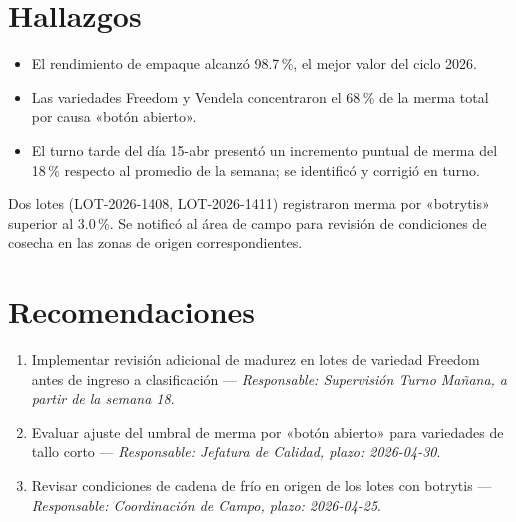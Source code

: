 \documentclass{../base/canon}
\begin{document}
\section{Hallazgos}

\begin{itemize}
  \item El rendimiento de empaque alcanzó 98.7\,\%, el mejor valor del ciclo 2026.
  \item Las variedades Freedom y Vendela concentraron el 68\,\% de la merma total
        por causa «botón abierto».
  \item El turno tarde del día 15-abr presentó un incremento puntual de merma del
        18\,\% respecto al promedio de la semana; se identificó y corrigió en turno.
\end{itemize}

\begin{ObservationBox}
  Dos lotes (LOT-2026-1408, LOT-2026-1411) registraron merma por «botrytis» superior
  al 3.0\,\%. Se notificó al área de campo para revisión de condiciones de cosecha
  en las zonas de origen correspondientes.
\end{ObservationBox}

\section{Recomendaciones}

\begin{enumerate}
  \item Implementar revisión adicional de madurez en lotes de variedad Freedom antes
        de ingreso a clasificación — \textit{Responsable: Supervisión Turno Mañana,
        a partir de la semana 18}.
  \item Evaluar ajuste del umbral de merma por «botón abierto» para variedades de
        tallo corto — \textit{Responsable: Jefatura de Calidad, plazo: 2026-04-30}.
  \item Revisar condiciones de cadena de frío en origen de los lotes con botrytis —
        \textit{Responsable: Coordinación de Campo, plazo: 2026-04-25}.
\end{enumerate}


\ContactSignature
\end{document}
